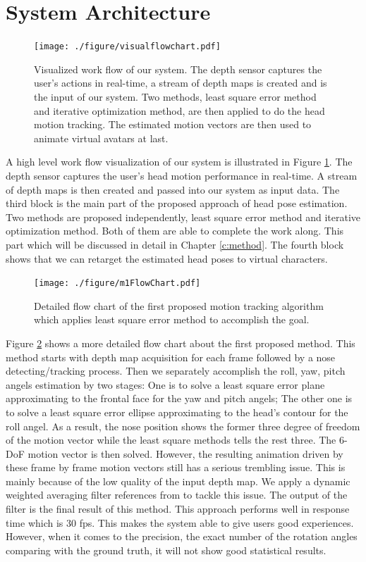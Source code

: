 \section{System Architecture}

\begin{figure}
\centering
\texttt{[image: ./figure/visualflowchart.pdf]}
\caption{Visualized work flow of our system. The depth sensor captures the user's actions in real-time, a stream of depth maps is created and is the input of our system. Two methods, least square error method and iterative optimization method, are then applied to do the head motion tracking. The estimated motion vectors are then used to animate virtual avatars at last.}
\label{f:visualized flow chart}
\end{figure}

A high level work flow visualization of our system is illustrated in Figure \ref{f:visualized flow chart}. The depth sensor captures the user's head motion performance in real-time. A stream of depth maps is then created and passed into our system as input data. The third block is the main part of the proposed approach of head pose estimation. Two methods are proposed independently, least square error method and iterative optimization method. Both of them are able to complete the work along. This part which will be discussed in detail in Chapter \ref{c:method}. The fourth block shows that we can retarget the estimated head poses to virtual characters.


\begin{figure}
\centering
\texttt{[image: ./figure/m1FlowChart.pdf]}
\caption{Detailed flow chart of the first proposed motion tracking algorithm which applies least square error method to accomplish the goal.}
\label{f:m1 flow chart}
\end{figure}

Figure \ref{f:m1 flow chart} shows a more detailed flow chart about the first proposed method. This method starts with depth map acquisition for each frame followed by a nose detecting/tracking process. Then we separately accomplish the roll, yaw, pitch angels estimation by two stages: One is to solve a least square error plane approximating to the frontal face for the yaw and pitch angels; The other one is to solve a least square error ellipse approximating to the head's contour for the roll angel. As a result, the nose position shows the former three degree of freedom of the motion vector while the least square methods tells the rest three. The 6-DoF motion vector is then solved. However, the resulting animation driven by these frame by frame motion vectors still has a serious trembling issue. This is mainly because of the low quality of the input depth map. We apply a dynamic weighted averaging filter references from \cite{Weise:11:RPBFA} to tackle this issue. The output of the filter is the final result of this method. This approach performs well in response time which is 30 fps. This makes the system able to give users good experiences. However, when it comes to the precision, the exact number of the rotation angles comparing with the ground truth, it will not show good statistical results.

